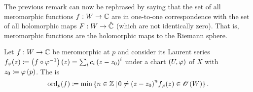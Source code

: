 \documentclass[../Moduli_Spaces_of_Riemann_Surfaces.tex]{subfiles}
\begin{document}
    \begin{remark}
        The previous remark can now be rephrased by saying that the set of all meromorphic functions $f:W\to\mathbb{C}$ are in one-to-one correspondence with the set of all holomorphic maps $F:W\to\hat{\mathbb{C}}$ (which are not identically zero). That is, meromorphic functions are the holomorphic maps to the Riemann sphere.\exqed
    \end{remark}
    \begin{definition}\label{1.2:def:order}
        Let $f:W\to\mathbb{C}$ be meromorphic at $p$ and consider its Laurent series $f_\varphi\!\left(z\right)\coloneqq\left(f\circ\varphi^{-1}\right)\left(z\right)=\sum_{i}c_i\left(z-z_0\right)^i$ under a chart $\left(U,\varphi\right)$ of $X$ with $z_0\coloneqq\varphi\left(p\right)$. The  is
        \begin{equation*}
            \operatorname{ord}_p\!\left(f\right)\coloneqq\operatorname{min}\left\{n\in\mathbb{Z}\,\middle\vert\,0\neq\left(z-z_0\right)^n\!f_\varphi\!\left(z\right)\in\mathscr{O}\left(W\right)\right\}.
        \end{equation*}
    \end{definition}
    \vspace{-0.05in}
\end{document}
